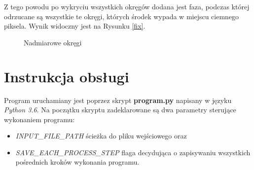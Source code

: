 \documentclass[12pt]{article}
\begin{document}
Z tego powodu po wykryciu wszystkich okręgów dodana jest faza, podczas której odrzucane są wszystkie te okręgi, których środek wypada w miejscu ciemnego piksela. Wynik widoczny jest na Rysunku \ref{fix}.

\begin{figure}[H]%
\centering
{}%
\qquad
{}%
\caption{Nadmiarowe okręgi}
\end{figure}

\section{Instrukcja obsługi}

Program uruchamiany jest poprzez skrypt \textbf{program.py} napisany w języku \textit{Python 3.6}. Na początku skryptu zadeklarowane są dwa parametry sterujące wykonaniem programu:
\begin{itemize}
\item \textit{INPUT\_FILE\_PATH} ścieżka do pliku wejściowego oraz
\item \textit{SAVE\_EACH\_PROCESS\_STEP} flaga decydująca o zapisywaniu wszystkich pośrednich kroków wykonania programu.
\end{itemize}
\end{document}
